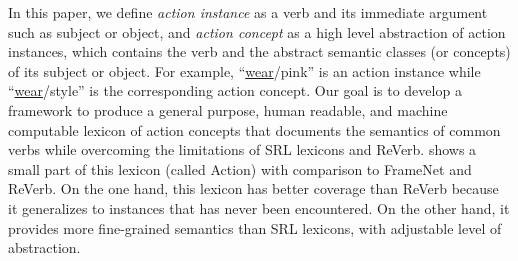 %
%

%

In this paper, we define {\em action instance} as a verb and its immediate
argument such as subject or object, and {\em action concept} as a high level
abstraction of action instances, which contains the verb and the abstract
semantic classes (or concepts) of its subject or object.
For example, ``\underline{wear}/pink'' is an action instance
while ``\underline{wear}/style'' is the corresponding action concept.
Our goal is to develop a framework to produce a general purpose,
human readable, and machine computable lexicon of action concepts that
documents the semantics of common verbs while
overcoming the limitations of SRL lexicons and ReVerb.
 shows a small part of this
lexicon (called Action) with comparison to FrameNet and ReVerb.
On the one hand, this lexicon
has better coverage than ReVerb because it generalizes to
instances that has never been encountered.
On the other hand, it provides more fine-grained
semantics than SRL lexicons, with adjustable level of abstraction.


